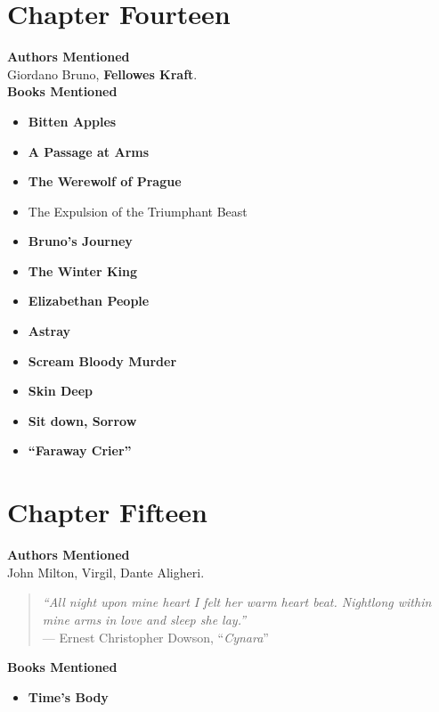 \documentclass[12pt,makeidx]{extreport}
\begin{document}
\section{Chapter Fourteen}
\textbf{Authors Mentioned}\\
Giordano Bruno, \textbf{Fellowes Kraft}.
\\

\hspace{-1.5em}\textbf{Books Mentioned}
\begin{itemize}
\item \textbf{Bitten Apples} \cite{Craft}
\item \textbf{A Passage at Arms} \cite{Crafta}
\item \textbf{The Werewolf of Prague} \cite{CraftW1}
\item The Expulsion of the Triumphant Beast \cite{Bruno1964}
\item \textbf{Bruno’s Journey} \cite{Craft1931}
\item \textbf{The Winter King} \cite{Craft1941}
\item \textbf{Elizabethan People} \cite{Craft1953}
\item \textbf{Astray} \cite{Craft1959}
\item \textbf{Scream Bloody Murder} \cite{Craft1939}
\item \textbf{Skin Deep} \cite{Craftb}
\item \textbf{Sit down, Sorrow} \cite{Craft1960}
\item \textbf{``Faraway Crier''} \cite{faraway}
\end{itemize}


\section{Chapter Fifteen}
\textbf{Authors Mentioned}\\
John Milton, Virgil, Dante Aligheri.
\\
\begin{quote}
\textit{``All night upon mine heart I felt her warm heart beat. Nightlong within mine arms in love and sleep she lay.''}\\
--- Ernest Christopher Dowson, ``\textit{Cynara}''
\end{quote}

\hspace{-1.5em}\textbf{Books Mentioned}
\begin{itemize}
\item \textbf{Time's Body} \cite{Barr}
\end{itemize}
\end{document}
